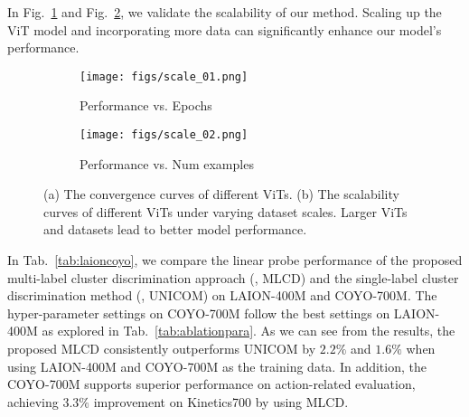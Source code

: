 In Fig.~\ref{scale:0} and Fig.~\ref{scale:1}, we validate the scalability of our method. Scaling up the ViT model and incorporating more data can significantly enhance our model's performance.

\begin{figure}[!t] 
\centering
  \begin{subfigure}[b]{0.35\textwidth} 
    \centering 
    \texttt{[image: figs/scale\_01.png]}
    \caption{Performance vs. Epochs}
    \label{scale:0}
  \end{subfigure}
  \hspace{1cm} 
  \begin{subfigure}[b]{0.35\textwidth} 
    \centering 
    \texttt{[image: figs/scale\_02.png]}
    \caption{Performance vs. Num examples}
    \label{scale:1}
  \end{subfigure}
  \caption{(a) The convergence curves of different ViTs. (b) The scalability curves of different ViTs under varying dataset scales. Larger ViTs and datasets lead to better model performance.}
  \label{scale}
\end{figure}

In Tab.~\ref{tab:laioncoyo}, we compare the linear probe performance of the proposed multi-label cluster discrimination approach (\ie, MLCD) and the single-label cluster discrimination method (\eg, UNICOM) on LAION-400M and COYO-700M. The hyper-parameter settings on COYO-700M follow the best settings on LAION-400M as explored in Tab.~\ref{tab:ablationpara}. 
As we can see from the results, the proposed MLCD consistently outperforms UNICOM by $2.2\%$ and $1.6\%$ when using LAION-400M and COYO-700M as the training data. In addition, the COYO-700M supports superior performance on action-related evaluation, achieving $3.3\%$ improvement on Kinetics700 by using MLCD.


